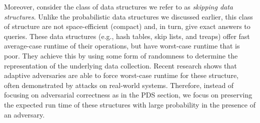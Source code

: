 Moreover, consider the class of data structures we refer to as \emph{skipping data structures}. Unlike the probabilistic data structures we discussed earlier, this class of structure are not space-efficient (compact) and, in turn, give exact answers to queries. These data structures (e.g., hash tables, skip lists, and treaps) offer fast average-case runtime of their operations, but have worst-case runtime that is  poor. They achieve this by using some form of randomness to determine the representation of the underlying data collection.  Recent research shows that adaptive adversaries are able to force worst-case runtime for these structure, often demonstrated by attacks on real-world systems. Therefore, instead of focusing on adversarial correctness as in the PDS section, we focus on preserving the expected run time of these structures with large probability in the presence of an adversary.